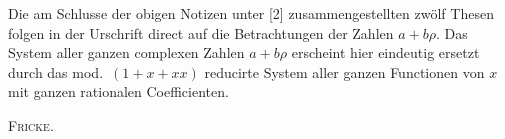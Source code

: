 Die am Schlusse der obigen Notizen unter [2] zusammengestellten zwölf Thesen folgen in der
Urschrift direct auf die Betrachtungen der Zahlen $a+b\rho$. Das System aller ganzen complexen
Zahlen $a+b\rho$ erscheint hier eindeutig ersetzt durch das mod.\ $(1+x+xx)$ reducirte System
aller ganzen Functionen von $x$ mit ganzen rationalen Coefficienten.
\par\nobreak\noindent\hfill\textsc{Fricke}.\par
\endgroup
